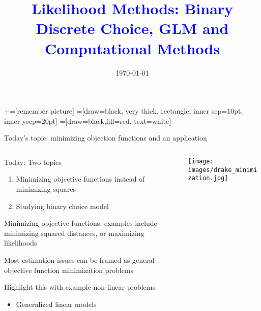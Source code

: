 \documentclass[notes,11pt, aspectratio=169]{beamer}
\title[]{\textcolor{blue}{Likelihood Methods: Binary Discrete Choice, GLM and Computational Methods}}
\author[PGP]{}
\institute[FRBNY]{\small{Paul Goldsmith-Pinkham}}
\date{\today}
\newenvironment{wideitemize}{\itemize\addtolength{\itemsep}{10pt}}{\enditemize}
\begin{document}
\newcommand\marktopleft[1]{%
    \tikz[overlay,remember picture] 
        \node (marker-#1-a) at (-.3em,.3em) {};%
}
\newcommand\markbottomright[2]{%
    \tikz[overlay,remember picture] 
        \node (marker-#1-b) at (0em,0em) {};%
}
+=[remember picture] 
 =[draw=black, very thick, rectangle, inner sep=10pt, inner ysep=20pt]
 =[draw=black,fill=red, text=white]

\begin{frame}
\maketitle

\end{frame}


\begin{frame}{Today's topic: minimizing objection functions and an application }
  \begin{columns}[T] %
    \begin{column}{.6\textwidth}
      \begin{wideitemize}
      \item Today: Two topics
        \begin{enumerate}
        \item Minimizing objective functions instead of minimizing squares
        \item Studying binary choice model
        \end{enumerate}
      \item Minimizing objective functions: examples include
        minimizing squared distances, or maximizing likelihoods
      \item Most estimation issues can be framed as general
        objective function minimization problems
      \item Highlight this with example non-linear problems
        \begin{itemize}
        \item Generalized linear models 
        \end{itemize}
      \end{wideitemize}
    \end{column}%
  \hfill%
  \begin{column}{.4\textwidth}
    \texttt{[image: images/drake\_minimization.jpg]}
  \end{column}
\end{columns}
\end{frame}
\end{document}
